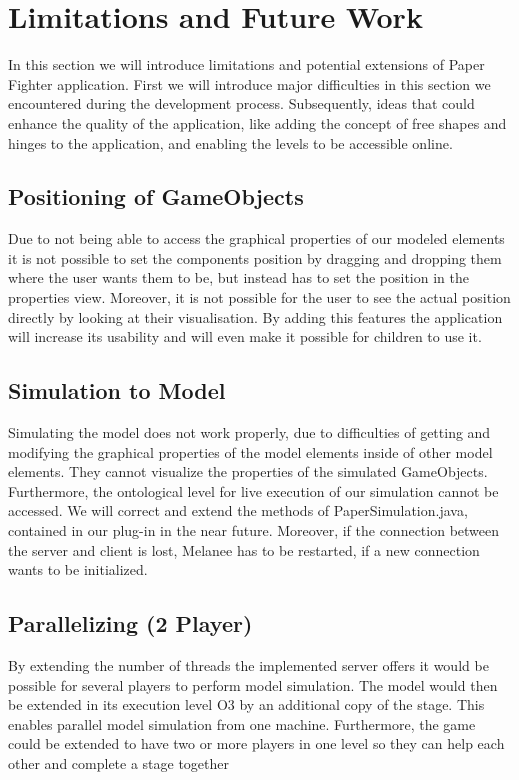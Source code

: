 \chapter{Limitations and Future Work}
In this section we will introduce limitations and potential extensions of Paper Fighter application. First we will introduce major difficulties in this section we encountered during the development process. Subsequently, ideas that could enhance the quality of the application, like adding the concept of free shapes and hinges to the application, and enabling the levels to be accessible online.

\section{Positioning of GameObjects}
Due to not being able to access the graphical properties of our modeled elements it is not possible to set the components position by dragging and dropping them where the user wants them to be, but instead has to set the position in the properties view. Moreover, it is not possible for the user to see the actual position directly by looking at their visualisation. By adding this features the application will increase its usability and will even make it possible for children to use it.

\section{Simulation to Model}
Simulating the model does not work properly, due to difficulties of getting and modifying the graphical properties of the model elements inside of other model elements. They cannot visualize the properties of the simulated GameObjects. Furthermore, the ontological level for live execution of our simulation cannot be accessed. We will correct and extend the methods of PaperSimulation.java, contained in our plug-in in the near future. Moreover, if the connection between the server and client is lost, Melanee has to be restarted, if a new connection wants to be initialized.

\section{Parallelizing (2 Player)}
By extending the number of threads the implemented server offers it would be possible for several players to perform model simulation. The model would then be extended in its execution level O3 by an additional copy of the stage. This enables parallel model simulation from one machine. Furthermore, the game could be extended to have two or more players in one level so they can help each other and complete a stage together

